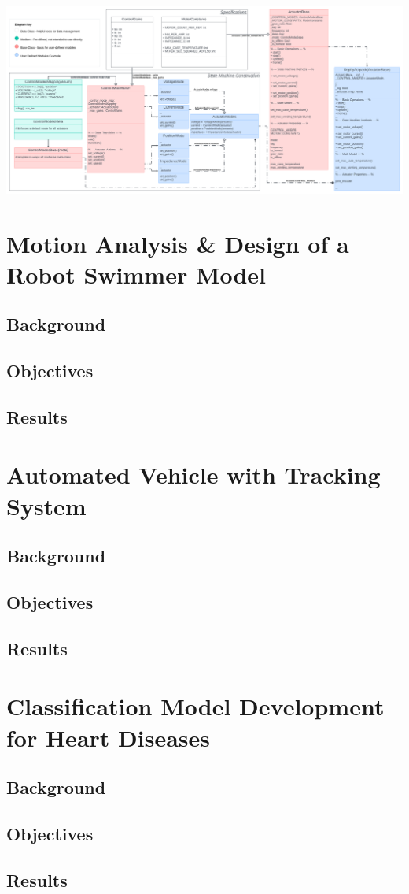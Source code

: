 \documentclass[12pt]{article}
\begin{document}
\includegraphics{portfolio/Class Diagram Base Lib.png}

\section{Motion Analysis \& Design of a Robot Swimmer Model}


\subsection{Background}

\subsection{Objectives}

\subsection{Results}


\section{Automated Vehicle with Tracking System}


\subsection{Background}

\subsection{Objectives}

\subsection{Results}


\section{Classification Model Development for Heart Diseases}


\subsection{Background}

\subsection{Objectives}

\subsection{Results}

\end{document}
